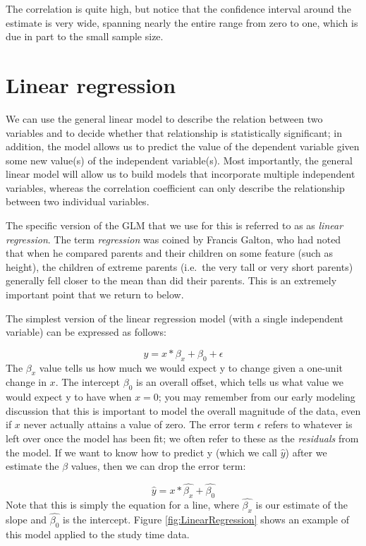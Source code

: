 \documentclass[
  12pt,
]{book}
\begin{document}
The correlation is quite high, but notice that the confidence interval around the estimate is very wide, spanning nearly the entire range from zero to one, which is due in part to the small sample size.

\hypertarget{linear-regression}{%
\section{Linear regression}\label{linear-regression}}

We can use the general linear model to describe the relation between two variables and to decide whether that relationship is statistically significant; in addition, the model allows us to predict the value of the dependent variable given some new value(s) of the independent variable(s). Most importantly, the general linear model will allow us to build models that incorporate multiple independent variables, whereas the correlation coefficient can only describe the relationship between two individual variables.

The specific version of the GLM that we use for this is referred to as as \emph{linear regression}. The term \emph{regression} was coined by Francis Galton, who had noted that when he compared parents and their children on some feature (such as height), the children of extreme parents (i.e.~the very tall or very short parents) generally fell closer to the mean than did their parents. This is an extremely important point that we return to below.

The simplest version of the linear regression model (with a single independent variable) can be expressed as follows:

\[
y = x * \beta_x + \beta_0 + \epsilon
\]
The \(\beta_x\) value tells us how much we would expect y to change given a one-unit change in \(x\). The intercept \(\beta_0\) is an overall offset, which tells us what value we would expect y to have when \(x=0\); you may remember from our early modeling discussion that this is important to model the overall magnitude of the data, even if \(x\) never actually attains a value of zero. The error term \(\epsilon\) refers to whatever is left over once the model has been fit; we often refer to these as the \emph{residuals} from the model. If we want to know how to predict y (which we call \(\hat{y}\)) after we estimate the \(\beta\) values, then we can drop the error term:

\[
\hat{y} = x * \hat{\beta_x} + \hat{\beta_0} 
\]
Note that this is simply the equation for a line, where \(\hat{\beta_x}\) is our estimate of the slope and \(\hat{\beta_0}\) is the intercept. Figure \ref{fig:LinearRegression} shows an example of this model applied to the study time data.
\end{document}
